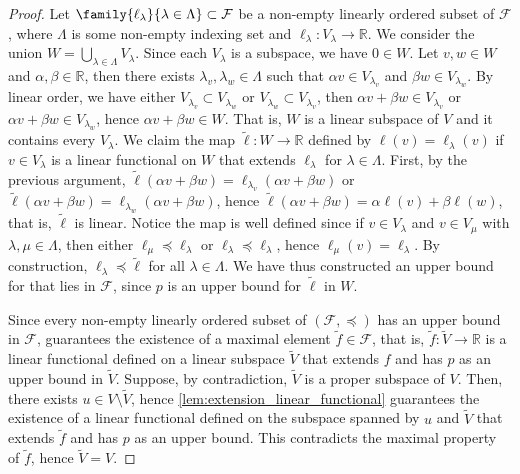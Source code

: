 \begin{proof}
    Let \(\family{\ell_{\lambda}}{\lambda \in \Lambda} \subset \mathcal{F}\) be a non-empty linearly ordered subset of \(\mathcal{F}\), where \(\Lambda\) is some non-empty indexing set and \(\ell_{\lambda} : V_{\lambda} \to \mathbb{R}\). We consider the union \(W = \bigcup_{\lambda \in \Lambda} V_{\lambda}\). Since each \(V_\lambda\) is a subspace, we have \(0 \in W\). Let \(v, w \in W\) and \(\alpha, \beta \in \mathbb{R}\), then there exists \(\lambda_v, \lambda_w \in \Lambda\) such that \(\alpha v \in V_{\lambda_v}\) and \(\beta w \in V_{\lambda_w}\). By linear order, we have either \(V_{\lambda_v} \subset V_{\lambda_w}\) or \(V_{\lambda_w} \subset V_{\lambda_v}\), then \(\alpha v + \beta w \in V_{\lambda_v}\) or \(\alpha v + \beta w \in V_{\lambda_w}\), hence \(\alpha v + \beta w \in W\). That is, \(W\) is a linear subspace of \(V\) and it contains every \(V_{\lambda}\). We claim the map \(\tilde{\ell} : W \to \mathbb{R}\) defined by \(\ell(v) = \ell_{\lambda}(v)\) if \(v \in V_{\lambda}\) is a linear functional on \(W\) that extends \(\ell_{\lambda}\) for \(\lambda \in \Lambda\). First, by the previous argument, \(\tilde{\ell}(\alpha v + \beta w) = \ell_{\lambda_v}(\alpha v + \beta w)\) or \(\tilde{\ell}(\alpha v + \beta w) = \ell_{\lambda_w}(\alpha v + \beta w)\), hence \(\tilde{\ell}(\alpha v + \beta w) = \alpha \ell(v) + \beta \ell(w)\), that is, \(\tilde{\ell}\) is linear. Notice the map is well defined since if \(v \in V_{\lambda}\) and \(v \in V_{\mu}\) with \(\lambda, \mu \in \Lambda\), then either \(\ell_{\mu} \preceq \ell_\lambda\) or \(\ell_{\lambda} \preceq \ell_{\lambda}\), hence \(\ell_{\mu}(v) = \ell_{\lambda}\). By construction, \(\ell_{\lambda} \preceq \tilde{\ell}\) for all \(\lambda \in \Lambda\). We have thus constructed an upper bound for \family{\ell_{\lambda}}{\lambda \in \Lambda} that lies in \(\mathcal{F}\), since \(p\) is an upper bound for \(\tilde{\ell}\) in \(W\).

    Since every non-empty linearly ordered subset of \((\mathcal{F}, \preceq)\) has an upper bound in \(\mathcal{F}\),  guarantees the existence of a maximal element \(\tilde{f} \in \mathcal{F}\), that is, \(\tilde{f} : \tilde{V} \to \mathbb{R}\) is a linear functional defined on a linear subspace \(\tilde{V}\) that extends \(f\) and has \(p\) as an upper bound in \(\tilde{V}\). Suppose, by contradiction, \(\tilde{V}\) is a proper subspace of \(V\). Then, there exists \(u \in V \setminus \tilde{V}\), hence \cref{lem:extension_linear_functional} guarantees the existence of a linear functional defined on the subspace spanned by \(u\) and \(\tilde{V}\) that extends \(\tilde{f}\) and has \(p\) as an upper bound. This contradicts the maximal property of \(\tilde{f}\), hence \(\tilde{V} = V\).
\end{proof}

